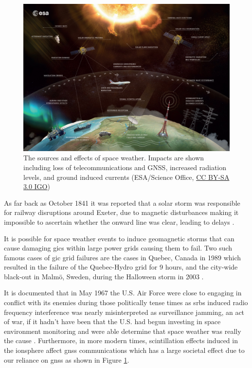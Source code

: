 \begin{figure}[ht!]
	\centering
	\includegraphics[width=\columnwidth]{Space_weather_effects_rescaled.jpg}
	\caption{The sources and effects of space weather. Impacts are shown including loss of telecommunications and GNSS, increased radiation levels, and ground induced currents (ESA/Science Office, \href{http://www.esa.int/spaceinimages/ESA_Multimedia/Copyright_Notice_Images}{CC BY-SA 3.0 IGO})}
	\label{fig:space_weather_impacts}
\end{figure}

As far back as October 1841 it was reported that a solar storm was responsible for railway disruptions around Exeter, due to magnetic disturbances making it impossible to ascertain whether the onward line was clear, leading to delays \citep{nature_observations_1871}. 

It is possible for space weather events to induce geomagnetic storms that can cause damaging \glspl{gic} within large power grids causing them to fail. Two such famous cases of \gls{gic} grid failures are the cases in Quebec, Canada in 1989 which resulted in the failure of the Quebec-Hydro grid for 9 hours, and the city-wide black-out in Malm{\"o}, Sweden, during the Halloween storm in 2003 \citep{viljanen_european_2011, beggan_ground_2018}.

It is documented that in May 1967 the U.S. Air Force were close to engaging in conflict with its enemies during those politically tense times as \glspl{srb} induced radio frequency interference was nearly misinterpreted as surveillance jamming, an act of war, if it hadn't have been that the U.S. had begun investing in space environment monitoring and were able determine that space weather was really the cause \citep{knipp_may_2016}. Furthermore, in more modern times, scintillation effects induced in the ionsphere affect \gls{gnss} communications which has a large societal effect due to our reliance on \gls{gnss} \citep{cannon_extreme_2013} as shown in Figure \ref{fig:space_weather_impacts}.

